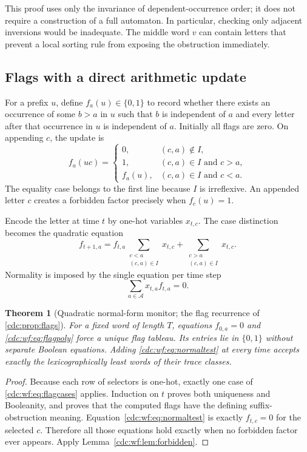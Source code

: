 \documentclass[11pt,a4paper]{article}
\newtheorem{theorem}{Theorem}[section]
\theoremstyle{definition}
\theoremstyle{remark}
\newcommand{\A}{\mathcal A}
\begin{document}
This proof uses only the invariance of dependent-occurrence order; it does not require a construction of a full automaton. In particular, checking only adjacent inversions would be inadequate. The middle word $v$ can contain letters that prevent a local sorting rule from exposing the obstruction immediately.

\subsection{Flags with a direct arithmetic update}
For a prefix $u$, define $f_a(u)\in\{0,1\}$ to record whether there exists an occurrence of some $b>a$ in $u$ such that $b$ is independent of $a$ and every letter after that occurrence in $u$ is independent of $a$. Initially all flags are zero. On appending $c$, the update is
\begin{equation}\label{cdc:wf:eq:flagcases}
 f_a(uc)=
 \begin{cases}
 0,&(c,a)\notin I,\\
 1,&(c,a)\in I\text{ and }c>a,\\
 f_a(u),&(c,a)\in I\text{ and }c<a.
 \end{cases}
\end{equation}
The equality case belongs to the first line because $I$ is irreflexive. An appended letter $c$ creates a forbidden factor precisely when $f_c(u)=1$.

Encode the letter at time $t$ by one-hot variables $x_{t,c}$. The case distinction becomes the quadratic equation
\begin{equation}\label{cdc:wf:eq:flagpoly}
 f_{t+1,a}=
 f_{t,a}\sum_{\substack{c<a\\(c,a)\in I}}x_{t,c}
 +\sum_{\substack{c>a\\(c,a)\in I}}x_{t,c}.
\end{equation}
Normality is imposed by the single equation per time step
\begin{equation}\label{cdc:wf:eq:normaltest}
 \sum_{a\in\A}x_{t,a}f_{t,a}=0.
\end{equation}

\begin{theorem}[Quadratic normal-form monitor; the flag recurrence of \cref{cdc:prop:flags}]\label{cdc:wf:thm:monitor}
For a fixed word of length $T$, equations $f_{0,a}=0$ and \eqref{cdc:wf:eq:flagpoly} force a unique flag tableau. Its entries lie in $\{0,1\}$ without separate Boolean equations. Adding \eqref{cdc:wf:eq:normaltest} at every time accepts exactly the lexicographically least words of their trace classes.
\end{theorem}
\begin{proof}
Because each row of selectors is one-hot, exactly one case of \eqref{cdc:wf:eq:flagcases} applies. Induction on $t$ proves both uniqueness and Booleanity, and proves that the computed flags have the defining suffix-obstruction meaning. Equation~\eqref{cdc:wf:eq:normaltest} is exactly $f_{t,c}=0$ for the selected $c$. Therefore all those equations hold exactly when no forbidden factor ever appears. Apply Lemma~\ref{cdc:wf:lem:forbidden}.
\end{proof}
\end{document}
